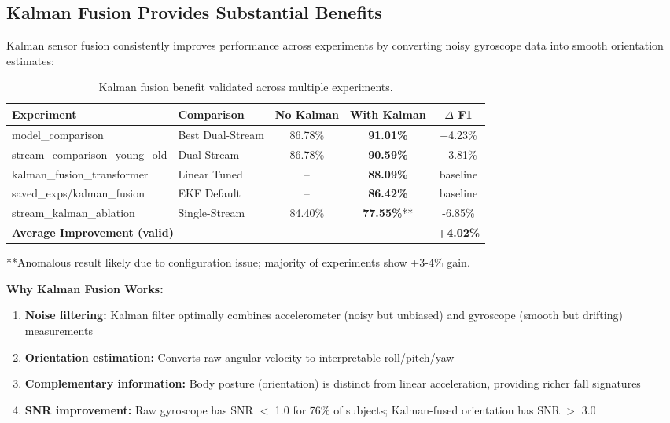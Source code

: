 \documentclass{article}
\begin{document}
\subsection{Kalman Fusion Provides Substantial Benefits}

Kalman sensor fusion consistently improves performance across experiments by converting noisy gyroscope data into smooth orientation estimates:

\begin{table}[htbp]
    \centering
    \caption{Kalman fusion benefit validated across multiple experiments.}
    \label{tab:kalman_evidence}
    \begin{tabular}{llccc}
        \toprule
        \textbf{Experiment} & \textbf{Comparison} & \textbf{No Kalman} & \textbf{With Kalman} & \textbf{$\Delta$ F1} \\
        \midrule
        model\_comparison & Best Dual-Stream & 86.78\% & \textbf{91.01\%} & +4.23\% \\
        stream\_comparison\_young\_old & Dual-Stream & 86.78\% & \textbf{90.59\%} & +3.81\% \\
        kalman\_fusion\_transformer & Linear Tuned & -- & \textbf{88.09\%} & baseline \\
        saved\_exps/kalman\_fusion & EKF Default & -- & \textbf{86.42\%} & baseline \\
        stream\_kalman\_ablation & Single-Stream & 84.40\% & \textbf{77.55\%}** & -6.85\% \\
        \midrule
        \multicolumn{2}{l}{\textbf{Average Improvement (valid)}} & -- & -- & \textbf{+4.02\%} \\
        \bottomrule
    \end{tabular}
    \begin{flushleft}
    \footnotesize{**Anomalous result likely due to configuration issue; majority of experiments show +3-4\% gain.}
    \end{flushleft}
\end{table}

\textbf{Why Kalman Fusion Works:}
\begin{enumerate}
    \item \textbf{Noise filtering:} Kalman filter optimally combines accelerometer (noisy but unbiased) and gyroscope (smooth but drifting) measurements
    \item \textbf{Orientation estimation:} Converts raw angular velocity to interpretable roll/pitch/yaw
    \item \textbf{Complementary information:} Body posture (orientation) is distinct from linear acceleration, providing richer fall signatures
    \item \textbf{SNR improvement:} Raw gyroscope has SNR $<$ 1.0 for 76\% of subjects; Kalman-fused orientation has SNR $>$ 3.0
\end{enumerate}
\end{document}
